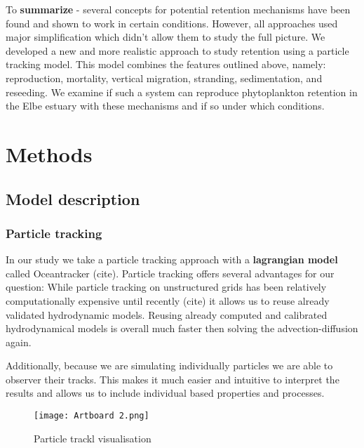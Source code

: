 To \textbf{summarize} - several concepts for potential retention mechanisms have been found
 and shown to work in certain conditions.
However, all approaches used major simplification which didn't allow them to study the full picture.
We developed a new and more realistic approach to study retention using a particle tracking model.
This model combines the features outlined above, namely: reproduction, mortality, vertical migration, stranding, sedimentation, and reseeding.
We examine if such a system can reproduce phytoplankton retention in the Elbe estuary with these mechanisms and if so under which conditions.




\section*{Methods}

\subsection*{Model description}

\subsubsection*{Particle tracking}

In our study we take a particle tracking approach with a \textbf{lagrangian model} called Oceantracker (cite).
Particle tracking offers several advantages for our question:
While particle tracking on unstructured grids has been relatively computationally expensive until recently (cite)
 it allows us to reuse already validated hydrodynamic models.
Reusing already computed and calibrated hydrodynamical models is overall much faster then solving the advection-diffusion again.

Additionally, because we are simulating individually particles we are able to observer their tracks.
This makes it much easier and intuitive to interpret the results and allows us to include individual based properties and processes.

\begin{figure}
    \texttt{[image: Artboard 2.png]}
    \caption{Particle trackl visualisation}
\end{figure}

